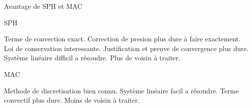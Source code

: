 \begin{frame}{Avantage de SPH et MAC}
 
 \begin{block}{SPH}
  \begin{itemize}
   \plusitem Terme de convection exact.
   \moinsitem Correction de presion plus dure à faire exactement.
   \plusitem Loi de conservation interessante.
   \moinsitem Justification et preuve de convergence plus dure.
   \moinsitem Système linéaire difficil a résoudre.
   \moinsitem Plus de voisin à traiter.
  \end{itemize}

 \end{block}

 \begin{block}{MAC}
  \begin{itemize}
   \plusitem Methode de discretisation bien connu.
   \plusitem Système linéaire facil a résoudre.
   \moinsitem Terme convectif plus dure.
   \plusitem Moins de voisin à traiter.
  \end{itemize}

 \end{block}

 
\end{frame}





